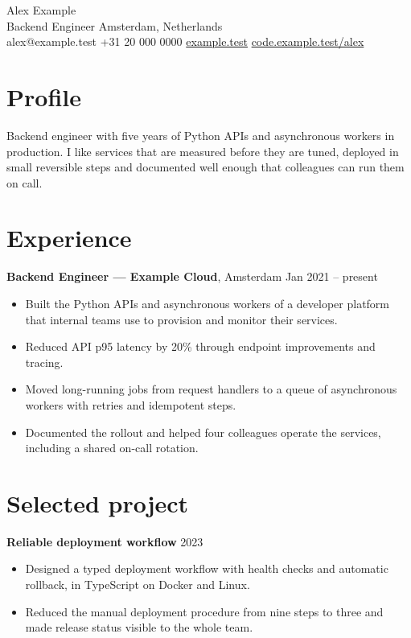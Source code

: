 \documentclass[10pt,a4paper]{article}
\begin{document}
{\LARGE Alex Example}\\[3pt]
Backend Engineer \hfill Amsterdam, Netherlands\\
alex@example.test \textperiodcentered{} +31 20 000 0000 \hfill
\href{https://example.test}{example.test} \textperiodcentered{}
\href{https://code.example.test/alex}{code.example.test/alex}

\section*{Profile}
Backend engineer with five years of Python APIs and asynchronous workers in
production. I like services that are measured before they are tuned, deployed
in small reversible steps and documented well enough that colleagues can run
them on call.

\section*{Experience}
\textbf{Backend Engineer --- Example Cloud}, Amsterdam \hfill Jan 2021 -- present
\begin{itemize}
  \item Built the Python APIs and asynchronous workers of a developer platform
    that internal teams use to provision and monitor their services.
  \item Reduced API p95 latency by 20\% through endpoint improvements and
    tracing.
  \item Moved long-running jobs from request handlers to a queue of
    asynchronous workers with retries and idempotent steps.
  \item Documented the rollout and helped four colleagues operate the services,
    including a shared on-call rotation.
\end{itemize}

\section*{Selected project}
\textbf{Reliable deployment workflow} \hfill 2023
\begin{itemize}
  \item Designed a typed deployment workflow with health checks and automatic
    rollback, in TypeScript on Docker and Linux.
  \item Reduced the manual deployment procedure from nine steps to three and
    made release status visible to the whole team.
\end{itemize}
\end{document}
